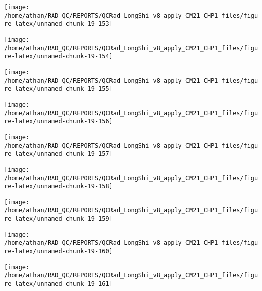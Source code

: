 \documentclass[
  10pt,
  a4paper,oneside]{article}
\begin{document}
\begin{center}\texttt{[image: /home/athan/RAD\_QC/REPORTS/QCRad\_LongShi\_v8\_apply\_CM21\_CHP1\_files/figure-latex/unnamed-chunk-19-153]} \end{center}

\begin{center}\texttt{[image: /home/athan/RAD\_QC/REPORTS/QCRad\_LongShi\_v8\_apply\_CM21\_CHP1\_files/figure-latex/unnamed-chunk-19-154]} \end{center}

\begin{center}\texttt{[image: /home/athan/RAD\_QC/REPORTS/QCRad\_LongShi\_v8\_apply\_CM21\_CHP1\_files/figure-latex/unnamed-chunk-19-155]} \end{center}

\begin{center}\texttt{[image: /home/athan/RAD\_QC/REPORTS/QCRad\_LongShi\_v8\_apply\_CM21\_CHP1\_files/figure-latex/unnamed-chunk-19-156]} \end{center}

\begin{center}\texttt{[image: /home/athan/RAD\_QC/REPORTS/QCRad\_LongShi\_v8\_apply\_CM21\_CHP1\_files/figure-latex/unnamed-chunk-19-157]} \end{center}

\begin{center}\texttt{[image: /home/athan/RAD\_QC/REPORTS/QCRad\_LongShi\_v8\_apply\_CM21\_CHP1\_files/figure-latex/unnamed-chunk-19-158]} \end{center}

\begin{center}\texttt{[image: /home/athan/RAD\_QC/REPORTS/QCRad\_LongShi\_v8\_apply\_CM21\_CHP1\_files/figure-latex/unnamed-chunk-19-159]} \end{center}

\begin{center}\texttt{[image: /home/athan/RAD\_QC/REPORTS/QCRad\_LongShi\_v8\_apply\_CM21\_CHP1\_files/figure-latex/unnamed-chunk-19-160]} \end{center}

\begin{center}\texttt{[image: /home/athan/RAD\_QC/REPORTS/QCRad\_LongShi\_v8\_apply\_CM21\_CHP1\_files/figure-latex/unnamed-chunk-19-161]} \end{center}
\end{document}

